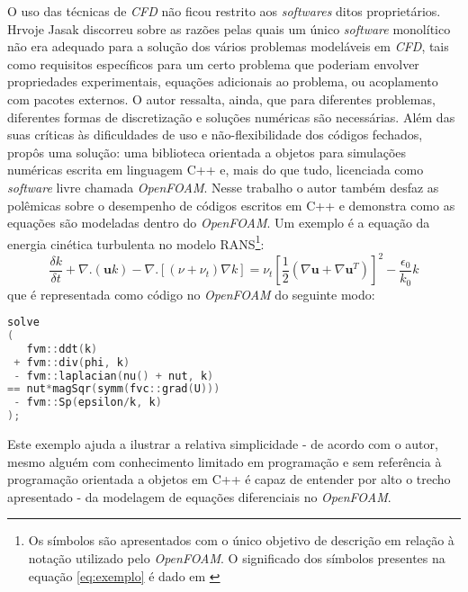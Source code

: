 O uso das técnicas de \textit{CFD} não ficou restrito aos \textit{softwares} ditos proprietários.
Hrvoje Jasak discorreu sobre as razões pelas quais um único \textit{software} monolítico
não era adequado para a solução dos vários problemas modeláveis em \textit{CFD}, tais como requisitos
específicos para um certo problema que poderiam envolver propriedades
experimentais, equações adicionais ao problema, ou acoplamento com pacotes externos.
O autor ressalta, ainda, que para diferentes problemas, diferentes formas de discretização
e soluções numéricas são necessárias. Além das suas críticas às dificuldades de uso e
não-flexibilidade dos códigos fechados, propôs uma solução: uma biblioteca
orientada a objetos para simulações numéricas escrita em linguagem C++ e, mais do que tudo,
licenciada como \textit{software} livre \cite{Jasak2007} chamada \textit{OpenFOAM}.
Nesse trabalho o autor também desfaz as polêmicas sobre o desempenho de códigos escritos
em C++ e demonstra como as equações são modeladas dentro do \textit{OpenFOAM}. Um
exemplo é a equação da energia cinética turbulenta no modelo RANS\footnote{Os símbolos
  são apresentados com o único objetivo de descrição em relação à notação utilizado pelo
  \textit{OpenFOAM}. O significado dos símbolos presentes na equação \ref{eq:exemplo} é dado em \cite{Jasak2007}}:
\begin{equation}
  \label{eq:exemplo}
  \frac{\delta k}{\delta t} + \nabla . (\mathbf{u}k) - \nabla . [(\nu + \nu_{t})
    \nabla k] = \nu_t \left[ \frac{1}{2}(\nabla \mathbf{u} + \nabla \mathbf{u}^T)\right]^2 - \frac{\epsilon_0}{k_0}k
\end{equation}
que é representada como código no \textit{OpenFOAM} do seguinte modo:
\begin{lstlisting}[language=c++]
solve
(
   fvm::ddt(k)
 + fvm::div(phi, k)
 - fvm::laplacian(nu() + nut, k)
== nut*magSqr(symm(fvc::grad(U)))
 - fvm::Sp(epsilon/k, k)
);  
\end{lstlisting}

Este exemplo ajuda a ilustrar a relativa simplicidade - de acordo com o autor, mesmo
alguém com conhecimento limitado em programação e sem referência à programação orientada
a objetos em C++ é capaz de entender por alto o trecho apresentado - da modelagem
de equações diferenciais no \textit{OpenFOAM}.

